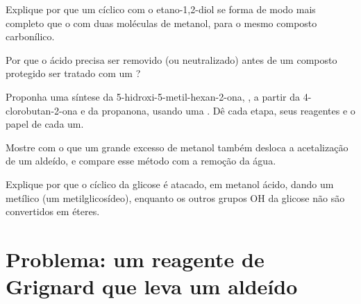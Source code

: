 \begin{exercise}[$\star\star$]\label{exo:b1:acetals-protection:8}
Explique por que um  cíclico com o etano-1,2-diol se forma de modo
mais completo que o  com duas moléculas de metanol, para o mesmo
composto carbonílico.
\end{exercise}

\begin{exercise}[$\star\star$]\label{exo:b1:acetals-protection:9}
Por que o  ácido precisa ser removido (ou neutralizado) antes
de um composto protegido ser tratado com um ?
\end{exercise}

\begin{exercise}[$\star\star\star$]\label{exo:b1:acetals-protection:10}
Proponha uma síntese da 5-hidroxi-5-metil-hexan-2-ona,
, a partir da 4-clorobutan-2-ona e da propanona,
usando uma . Dê cada etapa, seus reagentes e o papel de cada um.
\end{exercise}

\begin{exercise}[$\star\star\star$]\label{exo:b1:acetals-protection:11}
Mostre com o  que um grande excesso de metanol também
desloca a acetalização de um aldeído, e compare esse método com a
remoção da água.
\end{exercise}

\begin{exercise}[$\star\star\star$]\label{exo:b1:acetals-protection:12}
Explique por que o  cíclico da glicose é atacado, em metanol
ácido, dando um  metílico (um metilglicosídeo), enquanto os outros
grupos OH da glicose não são convertidos em éteres.
\end{exercise}

\section{Problema: um reagente de Grignard que leva um aldeído}

